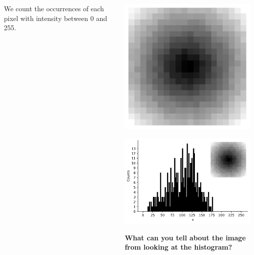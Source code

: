 \documentclass[9pt, aspectratio=169]{beamer}
\begin{document}
\begin{frame}
\begin{columns}
\begin{column}{0.5\textwidth}
{                We count the occurrences of each pixel with intensity between 0 and 255.
            }
        \end{column}
        \begin{column}{0.5\textwidth}
            {
                \includegraphics[width=.7\textwidth]{image_for_histo.png}
            }
            {
                \includegraphics[width=\textwidth]{imagehist.png}

                \textbf{What can you tell about the image from looking at the histogram?}
            }
        \end{column}
    \end{columns}
\end{frame}
\end{document}
